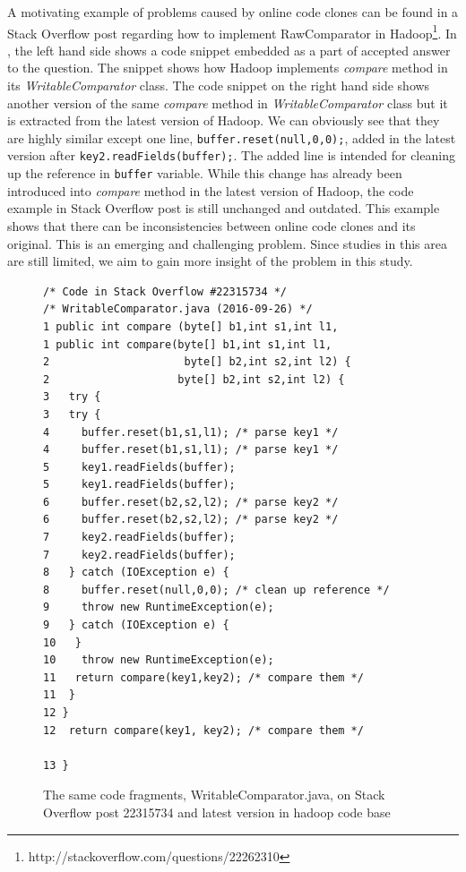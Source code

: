 \documentclass{sig-alternate-05-2015}
\begin{document}
A motivating example of problems caused by online code clones can be found in a Stack Overflow post regarding how to implement RawComparator in Hadoop\footnote{http://stackoverflow.com/questions/22262310}. In , the left hand side shows a code snippet embedded as a part of accepted answer to the question. The snippet shows how Hadoop implements \textit{compare} method in its \textit{WritableComparator} class. The code snippet on the right hand side shows another version of the same \textit{compare} method in \textit{WritableComparator} class but it is extracted from the latest version of Hadoop. We can obviously see that they are highly similar except one line, \verb|buffer.reset(null,0,0);|, added in the latest version after \verb|key2.readFields(buffer);|. The added line is intended for cleaning up the reference in \verb|buffer| variable. While this change has already been introduced into \textit{compare} method in the latest version of Hadoop, the code example in Stack Overflow post is still unchanged and outdated. This example shows that there can be inconsistencies between online code clones and its original.  %
This is an emerging and challenging problem. Since studies in this area are still limited, we aim to gain more insight of the problem in this study. %

\begin{figure}
\begin{lstlisting}
/* Code in Stack Overflow #22315734 */                      /* WritableComparator.java (2016-09-26) */
1 public int compare (byte[] b1,int s1,int l1,              1 public int compare(byte[] b1,int s1,int l1,
2                     byte[] b2,int s2,int l2) {            2                    byte[] b2,int s2,int l2) {
3   try {                                                   3   try {
4     buffer.reset(b1,s1,l1); /* parse key1 */              4     buffer.reset(b1,s1,l1); /* parse key1 */
5     key1.readFields(buffer);                              5     key1.readFields(buffer);
6     buffer.reset(b2,s2,l2); /* parse key2 */              6     buffer.reset(b2,s2,l2); /* parse key2 */
7     key2.readFields(buffer);                              7     key2.readFields(buffer);
8   } catch (IOException e) {                               8     buffer.reset(null,0,0); /* clean up reference */
9     throw new RuntimeException(e);                        9   } catch (IOException e) {
10   }                                                      10    throw new RuntimeException(e);
11   return compare(key1,key2); /* compare them */          11  }
12 }                                                        12  return compare(key1, key2); /* compare them */
                                                            13 }
\end{lstlisting}
\caption{The same code fragments, WritableComparator.java, on Stack Overflow post 22315734 and latest version in hadoop code base}
\label{fig:before-after}
\end{figure}
\end{document}
